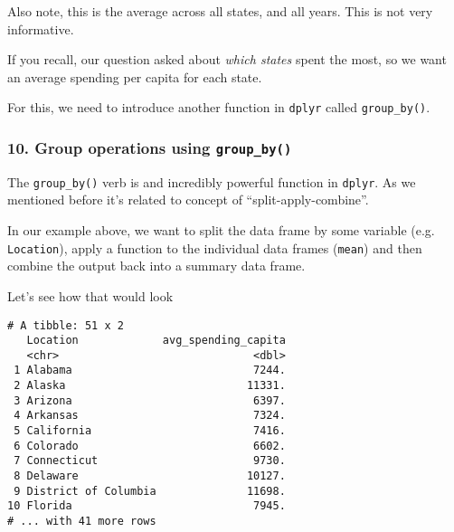 \documentclass[]{article}
\newenvironment{Shaded}{\begin{snugshade}}{\end{snugshade}}
\newcommand{\DataTypeTok}[1]{\textcolor[rgb]{0.13,0.29,0.53}{#1}}
\newcommand{\KeywordTok}[1]{\textcolor[rgb]{0.13,0.29,0.53}{\textbf{#1}}}
\newcommand{\NormalTok}[1]{#1}
\newcommand{\OperatorTok}[1]{\textcolor[rgb]{0.81,0.36,0.00}{\textbf{#1}}}
\newcommand{\StringTok}[1]{\textcolor[rgb]{0.31,0.60,0.02}{#1}}
\begin{document}
Also note, this is the average across all states, and all years. This is
not very informative.

If you recall, our question asked about \emph{which states} spent the
most, so we want an average spending per capita for each state.

For this, we need to introduce another function in \texttt{dplyr} called
\texttt{group\_by()}.

\hypertarget{group-operations-using-group_by}{%
\subsubsection{\texorpdfstring{10. Group operations using
\texttt{group\_by()}}{10. Group operations using group\_by()}}\label{group-operations-using-group_by}}

The \texttt{group\_by()} verb is and incredibly powerful function in
\texttt{dplyr}. As we mentioned before it's related to concept of
``split-apply-combine''.

In our example above, we want to split the data frame by some variable
(e.g. \texttt{Location}), apply a function to the individual data frames
(\texttt{mean}) and then combine the output back into a summary data
frame.

Let's see how that would look

\begin{Shaded}
\end{Shaded}

\begin{verbatim}
# A tibble: 51 x 2
   Location             avg_spending_capita
   <chr>                              <dbl>
 1 Alabama                            7244.
 2 Alaska                            11331.
 3 Arizona                            6397.
 4 Arkansas                           7324.
 5 California                         7416.
 6 Colorado                           6602.
 7 Connecticut                        9730.
 8 Delaware                          10127.
 9 District of Columbia              11698.
10 Florida                            7945.
# ... with 41 more rows
\end{verbatim}
\end{document}
